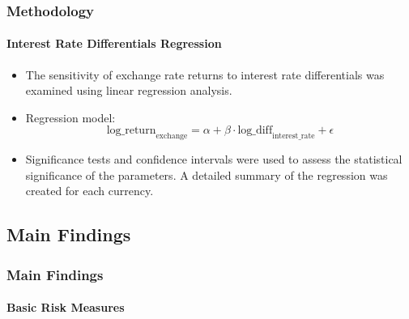 \documentclass[10pt]{beamer}
\begin{document}
\begin{frame}
\frametitle{Methodology}
\framesubtitle{Interest Rate Differentials Regression}
\begin{itemize}
    \item The sensitivity of exchange rate returns to interest rate differentials was examined using linear regression analysis. 
    \item Regression model: \[
    \text{log\_return}_{\text{exchange}} = \alpha + \beta \cdot \text{log\_diff}_{\text{interest\_rate}} + \epsilon
    \]
    \item Significance tests and confidence intervals were used to assess the statistical significance of the parameters. A detailed summary of the regression was created for each currency.
\end{itemize}
\end{frame}
\begin{frame}
\section{Main Findings}
\frametitle{Main Findings}
\framesubtitle{Basic Risk Measures}

\end{frame}
\end{document}
